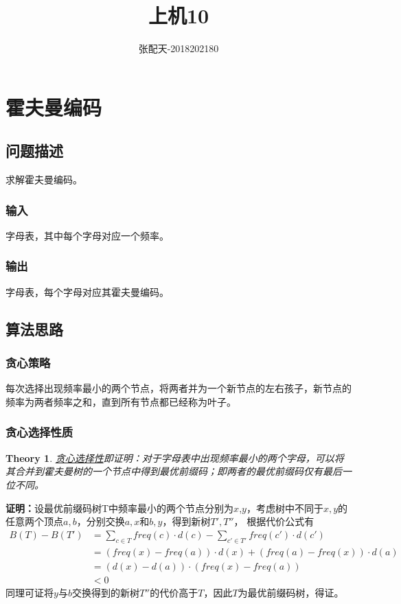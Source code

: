 \documentclass{ctexart}[UTF8]
\title{上机10}
\author{张配天-2018202180}
\newtheorem{theorem}{Theory}[section]
\begin{document}
    \maketitle
    \tableofcontents
    \clearpage
    \section{霍夫曼编码}
    \subsection{问题描述}
    求解霍夫曼编码。
    \subsubsection{输入}
    字母表，其中每个字母对应一个频率。
    \subsubsection{输出}
    字母表，每个字母对应其霍夫曼编码。
    \subsection{算法思路}
    \subsubsection{贪心策略}
    每次选择出现频率最小的两个节点，将两者并为一个新节点的左右孩子，新节点的频率为两者频率之和，直到所有节点都已经称为叶子。
    \subsubsection{贪心选择性质}
    \begin{theorem}
        \underline{贪心选择性}即证明：对于字母表中出现频率最小的两个字母，可以将其合并到霍夫曼树的一个节点中得到最优前缀码；即两者的最优前缀码仅有最后一位不同。
    \end{theorem}
    \textbf{证明：}设最优前缀码树T中频率最小的两个节点分别为$x$,$y$，考虑树中不同于$x,y$的任意两个顶点$a,b$，分别交换$a,x$和$b,y$，得到新树$T',T''$，
    根据代价公式有\begin{align*}
        B(T) - B(T') &= \sum_{c\in T}freq(c) \cdot d(c) - \sum_{c'\in T'}freq(c') \cdot d(c')\\
                    &= (freq(x) - freq(a))\cdot d(x) + (freq(a) - freq(x))\cdot d(a)\\
                    &= (d(x) - d(a))\cdot (freq(x) - freq(a)) \\
                    &< 0
    \end{align*}
    同理可证将$y$与$b$交换得到的新树$T''$的代价高于$T$，因此$T$为最优前缀码树，得证。
\end{document}
